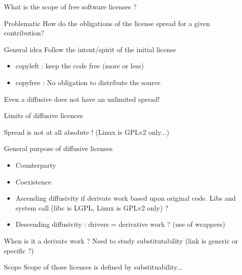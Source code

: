 \documentclass{beamer}
\begin{document}
\begin{frame}{What is the scope of free software licenses ?}

  \begin{alertblock}{Problematic}
    How do the obligations of the license spread for a given 		contribution?
  \end{alertblock}

  \begin{block}{General idea}
    Follow the intent/spirit of the initial license    
  \end{block}

  \begin{itemize}
  \item copyleft : keep the code free (more or less)
  \item copyfree : No obligation to distribute the source
  \end{itemize}

Even a diffusive does not have an unlimited spread!
  
\end{frame}


\begin{frame}{Limits of diffusive licences}

Spread is not at all absolute ! (Linux is GPLv2 only...)

  \begin{block}{General purpose of diffusive licenses}
    \begin{itemize}
    \item Counterparty
    \item Coexistence
    \end{itemize}
  \end{block}

  \begin{itemize}
  \item Ascending diffusivity if derivate work based upon original code. Libs and system call (libc is LGPL, Linux is GPLv2 only) ? 
  \item Descending diffusivity : drivers = derivative work ? (use of wrappers)
  \end{itemize}

When is it a derivate work ? Need to study substitutability (link is generic or specific ?)

  \begin{alertblock}{Scope}
    Scope of those licenses is defined by substituability...
  \end{alertblock}
\end{frame}
\end{document}
